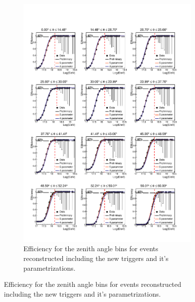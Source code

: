 \documentclass[12pt,a4paper]{article}
\begin{document}
\begin{figure}[]
\begin{figure}[p]
    \begin{center}
        \includegraphics[height=0.97\textheight]{plots/EfficiencyZenithNew.pdf}
        \caption{Efficiency for the zenith angle bins for events reconstructed including the new triggers and it's parametrizations.
        \label{fig:zenithNew}}
    \end{center}
\end{figure}


\end{figure}
\end{document}
